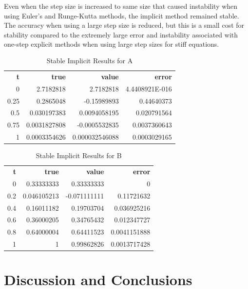 \documentclass{article}
\begin{document}
Even when the step size is increased to same size that caused instability when using Euler's and Runge-Kutta methods, the implicit method remained stable. The accuracy when using a large step size is reduced, but this is a small cost for stability compared to the extremely large error and instability associated with one-step explicit methods when using large step sizes for stiff equations.



\begin{table}
\footnotesize
\centering
\caption{Stable Implicit Results for A}
\label{tab:un_a_implicit}
\begin{tabular}{rrrr}
\textbf{t} & \textbf{true} & \textbf{value} & \textbf{error} \\
0          & 2.7182818     & 2.7182818      & 4.4408921E-016 \\
0.25       & 0.2865048     & -0.15989893    & 0.44640373     \\
0.5        & 0.030197383   & 0.0094058195   & 0.020791564    \\
0.75       & 0.0031827808  & -0.0005532835  & 0.0037360643   \\
1          & 0.0003354626  & 0.000032546088 & 0.0003029165   
\end{tabular}
\end{table}

\begin{table}
\footnotesize
\centering
\caption{Stable Implicit Results for B}
\label{tab:un_b_implicit}
\begin{tabular}{rrrr}
\textbf{t} & \textbf{true} & \textbf{value} & \textbf{error} \\
0          & 0.33333333    & 0.33333333     & 0              \\
0.2        & 0.046105213   & -0.071111111   & 0.11721632     \\
0.4        & 0.16011182    & 0.19703704     & 0.036925216    \\
0.6        & 0.36000205    & 0.34765432     & 0.012347727    \\
0.8        & 0.64000004    & 0.64411523     & 0.0041151888   \\
1          & 1             & 0.99862826     & 0.0013717428  
\end{tabular}
\end{table}




\section{Discussion and Conclusions}
\label{sec:conc}
\end{document}
